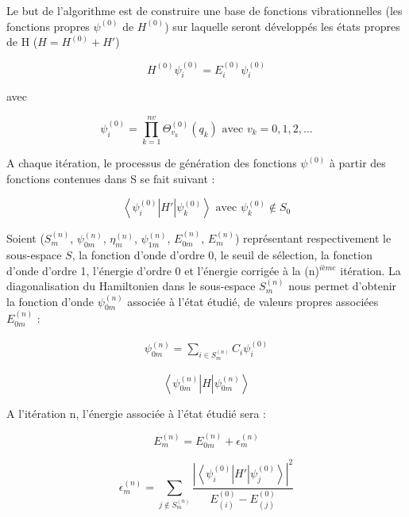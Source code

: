 \documentclass[12pt,a4paper]{book}
\begin{document}
Le but de l'algorithme est de construire une base de fonctions vibrationnelles (les fonctions propres $\psi^{(0)}$ de $H^{(0)}$) sur laquelle seront développés les états propres de H ($H=H^{(0)} + H'$)

\begin{equation}
H^{(0)} \psi^{(0)}_{i} = E^{(0)}_{i}  \psi^{(0)}_{i} 
\end{equation}

avec

\begin{equation}
\psi^{(0)}_{i} = \prod^{nv}_{k=1} \Theta^{(0)}_{v_k}(q_k) \text{ avec } v_k = 0,1,2, ...
\end{equation}

A chaque itération, le processus de génération des fonctions $\psi^{(0)}$ à partir des fonctions contenues dans S se fait suivant :

\begin{equation} 
\left\langle \psi^{(0)}_{i} \right \vert H' \left  \vert \psi^{(0)}_{k} \right\rangle \text{ avec }  \psi^{(0)}_{k} \notin S_0
\end{equation}

Soient ($S^{(n)}_{m}$, $\psi^{(n)}_{0m}$, $\eta^{(n)}_{m}$, $\psi^{(n)}_{1m}$, $E^{(n)}_{0m}$, $E^{(n)}_{m}$) représentant respectivement le sous-espace $S$, la fonction d'onde d'ordre 0, le seuil de sélection, la fonction d'onde d'ordre 1, l'énergie d'ordre 0 et l'énergie corrigée à la (n)$^{ième}$ itération. La diagonalisation du Hamiltonien dans le sous-espace $S^{(n)}_{m}$ nous permet d'obtenir la fonction d'onde $\psi^{(n)}_{0m}$ associée à l'état étudié, de valeurs propres associées $E^{(n)}_{0m}$ :


\begin{align} \label{dev}
\psi^{(n)}_{0m} =  \sum_{i \in  S^{(n)}_{m}}  C_i \psi^{(0)}_{i}
\end{align}

\begin{equation}
\left\langle \psi^{(n)}_{0m} \right| H \left| \psi^{(n)}_{0m} \right\rangle 
\end{equation}

A l'itération n, l'énergie associée à l'état étudié sera :

\begin{equation}
E^{(n)}_{m} = E^{(n)}_{0m} + \epsilon^{(n)}_{m}
\end{equation}

\begin{equation}
\epsilon^{(n)}_{m} =  \sum_{j \notin  S^{(n)}_{m}}  \frac{\left| \left\langle \psi^{(0)}_{i} \right| H' \left| \psi^{(0)}_{j} \right\rangle \right|^2}       {E^{(0)}_{(i)} - E^{(0)}_{(j)}}
\end{equation}
\end{document}
